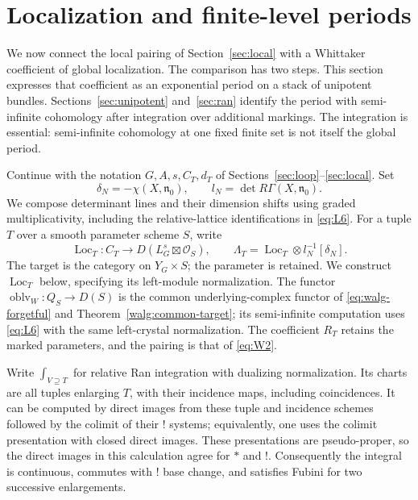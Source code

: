\section{Localization and finite-level periods}\label{sec:localization}

We now connect the local pairing of Section~\ref{sec:local} with a
Whittaker coefficient of global localization.  The comparison has two
steps.  This section expresses that coefficient as an exponential period
on a stack of unipotent bundles.  Sections~\ref{sec:unipotent}
and~\ref{sec:ran} identify the period with semi-infinite cohomology after
integration over additional markings.  The integration is essential:
semi-infinite cohomology at one fixed finite set is not itself the global
period.

Continue with the notation $G,A,s,C_T,d_T$ of
Sections~\ref{sec:loop}--\ref{sec:local}.  Set
\[
 \delta_N=-\chi(X,\mathfrak n_0),\qquad
 l_N=\det R\Gamma(X,\mathfrak n_0).
\]
We compose determinant lines and their dimension shifts using graded
multiplicativity, including the relative-lattice identifications in
\eqref{eq:L6}.  For a tuple $T$ over a smooth parameter scheme $S$, write
\[
 \operatorname{Loc}_T:C_T\longrightarrow
       D(L_G^s\boxtimes\mathcal O_S),\qquad
 \Lambda_T=\operatorname{Loc}_T\otimes l_N^{-1}[\delta_N].
\]
The target is the category on $Y_G\times S$; the parameter is retained.
We construct $\operatorname{Loc}_T$ below, specifying its left-module
normalization.  The functor $\operatorname{oblv}_W:Q_S\to D(S)$ is the
common underlying-complex functor of \eqref{eq:walg-forgetful} and
Theorem~\ref{walg:common-target};
its semi-infinite computation uses \eqref{eq:L6} with the same
left-crystal normalization.  The coefficient $R_T$ retains the marked
parameters, and the pairing is that of \eqref{eq:W2}.

Write $\int_{V\supseteq T}$ for relative Ran integration with dualizing
normalization.  Its charts are all tuples enlarging $T$, with their
incidence maps, including coincidences.  It can be computed by direct
images from these tuple and incidence schemes followed by the colimit
of their $!$ systems; equivalently, one uses the colimit presentation
with closed direct images.  These presentations are pseudo-proper,
so the direct images in this calculation agree for $*$ and $!$.
Consequently the integral is continuous, commutes with $!$ base change,
and satisfies Fubini for two successive enlargements.


